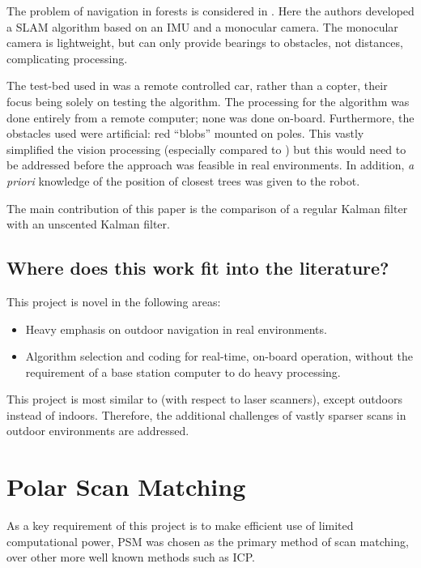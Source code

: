 \documentclass[12pt,oneside,a4paper]{book}
\begin{document}
The problem of navigation in forests is considered in
\cite{langelaan2005towards}. Here the authors developed a \gls{SLAM}
algorithm based on an \gls{IMU} and a monocular camera. The monocular
camera is lightweight, but can only provide bearings to obstacles, not
distances, complicating processing.

The test-bed used in \cite{langelaan2005towards} was a remote
controlled car, rather than a copter, their focus being solely on testing the
algorithm. The processing for the algorithm was done entirely from a
remote computer; none was done on-board. Furthermore, the obstacles
used were artificial: red ``blobs'' mounted on poles. This vastly
simplified the vision processing (especially compared to
\cite{5152680}) but this would need to be addressed before the
approach was feasible in real environments. In addition, \emph{a
  priori} knowledge of the position of  closest trees was given to the robot.

The main contribution of this paper is the comparison of a regular
Kalman filter with an unscented Kalman filter. 
 
\subsection{Where does this work fit into the literature?}
\label{sec:where-does-this}

This project is novel in the following areas:
\begin{itemize}
\item Heavy emphasis on outdoor navigation in real environments.
\item Algorithm selection and coding for real-time, on-board
  operation, without the requirement of a base station computer to
  do heavy processing.
\end{itemize}

This project is most similar to \cite{achtelik2009stereo} (with
respect to laser scanners), except outdoors instead of
indoors. Therefore, the additional challenges of vastly sparser scans
in outdoor environments are addressed.

\section{Polar Scan Matching}
\label{sec:polar-scan-matching}

As a key requirement of this project is to make efficient use of
limited computational power, \gls{PSM} was chosen as the
primary method of scan matching, over other more well known methods
such as \gls{ICP}.
\end{document}
